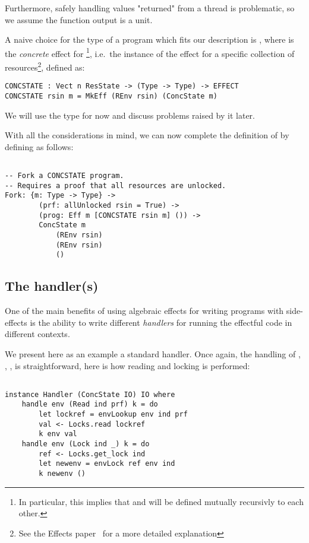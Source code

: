 Furthermore, safely handling values "returned" from a thread is problematic, so
we assume the function output is a unit.

A naive choice for the type of a program which fits our description is
, where  is the
\emph{concrete} effect for {\footnote{In
particular, this implies that  and  will be
defined mutually recursivly to each other.}}, i.e.~the
instance of the effect for a specific collection of resources\footnote{See the
Effects paper~\cite[p.~2]{effects-idr} for a more detailed explanation},
defined as:

\begin{BVerbatim}
CONCSTATE : Vect n ResState -> (Type -> Type) -> EFFECT
CONCSTATE rsin m = MkEff (REnv rsin) (ConcState m)
\end{BVerbatim}

We will use the type  for now and discuss
problems raised by it later.

With all the considerations in mind, we can now complete the definition of
 by defining  as follows:

\begin{BVerbatim}

-- Fork a CONCSTATE program.
-- Requires a proof that all resources are unlocked.
Fork: {m: Type -> Type} ->
        (prf: allUnlocked rsin = True) ->
        (prog: Eff m [CONCSTATE rsin m] ()) ->
        ConcState m
            (REnv rsin)
            (REnv rsin)
            ()

\end{BVerbatim}

\subsection{The handler(s)}

One of the main benefits of using algebraic effects for writing programs with
side-effects is the ability to write different \emph{handlers} for running the
effectful code in different contexts.

We present here as an example a standard  handler. Once again, the
handling of , , ,  is
straightforward, here is how reading and locking is performed:

\begin{BVerbatim}

instance Handler (ConcState IO) IO where
    handle env (Read ind prf) k = do
        let lockref = envLookup env ind prf
        val <- Locks.read lockref
        k env val
    handle env (Lock ind _) k = do
        ref <- Locks.get_lock ind
        let newenv = envLock ref env ind
        k newenv ()

\end{BVerbatim}

